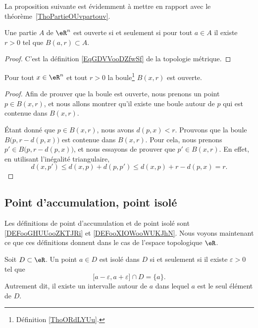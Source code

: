 La proposition suivante est évidemment à mettre en rapport avec le théorème~\ref{ThoPartieOUvpartouv}.
\begin{proposition}\label{PROPooEQYJooBbPiAj}
	Une partie \( A\) de \( \eR^n\) est ouverte si et seulement si pour tout \( a\in A\) il existe \( r>0\) tel que \( B(a,r)\subset A\).
\end{proposition}

\begin{proof}
	C'est la définition \ref{EqGDVVooDZfwSf} de la topologie métrique.
\end{proof}

\begin{lemma}   \label{LemMESSExh}
	Pour tout \( x \in \eR^n\) et tout \( r >0\) la boule\footnote{Définition \ref{ThoORdLYUu}.} \( B(x,r)\) est ouverte.
\end{lemma}

\begin{proof}
	Afin de prouver que la boule est ouverte, nous prenons un point \( p\in B(x,r)\), et nous allons montrer qu'il existe une boule autour de \( p\) qui est contenue dans \( B(x,r)\).

	Étant donné que \( p\in B(x,r)\), nous avons \( d(p,x)<r\). Prouvons que la boule \( B\big(p,r-d(p,x)\big)\) est contenue dans \( B(x,r)\). Pour cela, nous prenons \( p'\in B\big(p,r-d(p,x)\big)\), et nous essayons de prouver que \( p'\in B(x,r)\). En effet, en utilisant l'inégalité triangulaire,
	\begin{equation}
		d(x,p')\leq d(x,p)+d(p,p')\leq d(x,p)+r-d(p,x)=r.
	\end{equation}
\end{proof}

\subsection{Point d'accumulation, point isolé}

Les définitions de point d'accumulation et de point isolé sont \ref{DEFooGHUUooZKTJRi} et \ref{DEFooXIOWooWUKJhN}. Nous voyons maintenant ce que ces définitions donnent dans le cas de l'espace topologique \( \eR\).

\begin{lemma}
	Soit \( D\subset\eR\). Un point \( a\in D\) est isolé dans \( D\) si et seulement si il existe \( \varepsilon>0\) tel que
	\begin{equation}
		\mathopen[ a-\varepsilon , a+\varepsilon \mathclose]\cap D=\{ a \}.
	\end{equation}
	Autrement dit, il existe un intervalle autour de \( a\) dans lequel \( a\) est le seul élément de \( D\).
\end{lemma}

